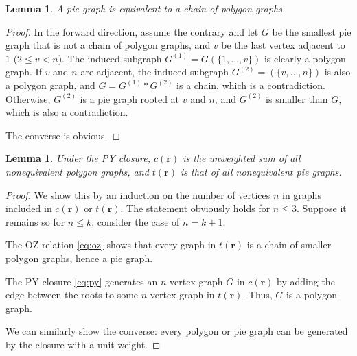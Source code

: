 \documentclass[notitlepage,preprint]{revtex4-1}
\newtheorem{lemm}[thrm]{Lemma}
\newcommand{\vct}[1]{\mathbf{#1}}
\providecommand{\vr}{} %
\renewcommand{\vr}{\vct{r}}
\begin{document}
\begin{lemm}
A pie graph is equivalent to
  a chain of polygon graphs.
\label{thm:pycat}
\end{lemm}

\begin{proof}
In the forward direction, assume the contrary and
%
let $G$ be the smallest pie graph
  that is not a chain of polygon graphs,
%
and $v$ be the last vertex adjacent to $1$ ($2 \le v < n$).
%
The induced subgraph $G^{(1)} = G(\{1, \dots, v\})$
  is clearly a polygon graph.
%
If $v$ and $n$ are adjacent,
  the induced subgraph $G^{(2)} = (\{v, \dots, n\})$
  is also a polygon graph,
  and $G = G^{(1)} * G^{(2)}$ is a chain,
  which is a contradiction.
%
Otherwise, $G^{(2)}$ is a pie graph
  rooted at $v$ and $n$,
  and $G^{(2)}$ is smaller than $G$,
  which is also a contradiction.

The converse is obvious.
\end{proof}



\begin{lemm}
Under the PY closure,
  $c(\vr)$ is the unweighted sum of
  all nonequivalent polygon graphs,
  and $t(\vr)$ is that of all nonequivalent pie graphs.
\label{thm:pycrsum}
\end{lemm}

\begin{proof}
We show this by an induction on the number of vertices $n$ in
  graphs included in $c(\vr)$ or $t(\vr)$.
%
The statement obviously holds for $n \le 3$.
%
Suppose it remains so for $n \le k$,
consider the case of $n = k + 1$.

The OZ relation \eqref{eq:oz}
  shows that every graph in $t(\vr)$
  is a chain of smaller polygon graphs,
  hence a pie graph. %

The PY closure \eqref{eq:py} generates
  an $n$-vertex graph $G$ in $c(\vr)$
  by adding the edge between the roots
  to some $n$-vertex graph in $t(\vr)$.
%
Thus, $G$ is a polygon graph.

We can similarly show the converse:
  every polygon or pie graph
  can be generated by the closure
  with a unit weight.
\end{proof}
\end{document}
